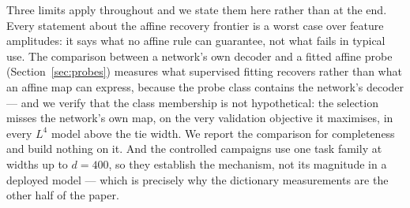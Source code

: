 Three limits apply throughout and we state them here rather than at the end. Every statement about
the affine recovery frontier is a worst case over feature amplitudes: it says what no affine rule can
guarantee, not what fails in typical use. The comparison between a network's own decoder and a fitted
affine probe (Section~\ref{sec:probes}) measures what supervised fitting recovers rather than what an
affine map can express, because the probe class contains the network's decoder --- and we verify
that the class membership is not hypothetical: the selection misses the network's own map, on the
very validation objective it maximises, in every $L^4$ model above the tie width. We report the
comparison for completeness and build nothing on it. And the controlled campaigns use one task family at widths up
to $d=400$, so they establish the mechanism, not its magnitude in a deployed model --- which is
precisely why the dictionary measurements are the other half of the paper.
